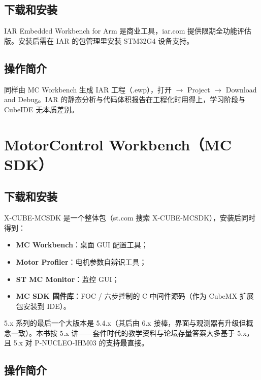 \documentclass[
  UTF8,
  scheme=plain,
  fontsize=10pt,
  openany
]{ctexbook}
\begin{document}
\subsection{下载和安装}\label{ux4e0bux8f7dux548cux5b89ux88c5-3}

IAR Embedded Workbench for Arm 是商业工具，iar.com
提供限期全功能评估版。安装后需在 IAR 的包管理里安装 STM32G4 设备支持。

\subsection{操作简介}\label{ux64cdux4f5cux7b80ux4ecb-1}

同样由 MC Workbench 生成 IAR 工程（.ewp），打开 \(\rightarrow\) Project
\(\rightarrow\) Download and Debug。IAR
的静态分析与代码体积报告在工程化时用得上，学习阶段与 CubeIDE
无本质差别。

\section{MotorControl Workbench（MC
SDK）}\label{motorcontrol-workbenchmc-sdk}

\subsection{下载和安装}\label{ux4e0bux8f7dux548cux5b89ux88c5-4}

X-CUBE-MCSDK 是一个整体包（st.com 搜索 X-CUBE-MCSDK），安装后同时得到：

\begin{itemize}
\tightlist
\item
  \textbf{MC Workbench}：桌面 GUI 配置工具；
\item
  \textbf{Motor Profiler}：电机参数自辨识工具；
\item
  \textbf{ST MC Monitor}：监控 GUI；
\item
  \textbf{MC SDK 固件库}：FOC / 六步控制的 C 中间件源码（作为 CubeMX
  扩展包安装到 IDE）。
\end{itemize}

5.x 系列的最后一个大版本是 5.4.x（其后由 6.x
接棒，界面与观测器有升级但概念一致）。本书按 5.x
讲------套件时代的教学资料与论坛存量答案大多基于 5.x，且 5.x 对
P-NUCLEO-IHM03 的支持最直接。

\subsection{操作简介}\label{ux64cdux4f5cux7b80ux4ecb-2}
\end{document}
